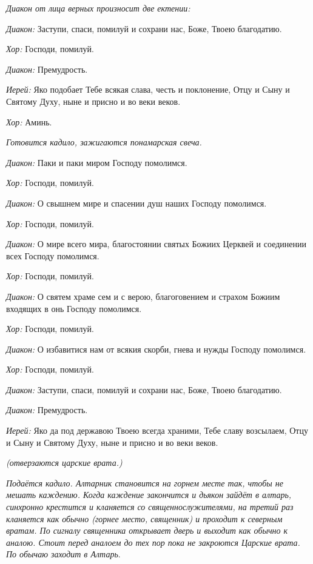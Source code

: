 \begin{mymulticols}


{\itshape Диакон от лица верных произносит две ектении:}

{\itshape Диакон:} Заступи, спаси, помилуй и сохрани нас, Боже, Твоею благодатию.

{\itshape Хор:} Господи, помилуй.

{\itshape Диакон:} Премудрость.

{\itshape Иерей:} Яко подобает Тебе всякая слава, честь и поклонение, Отцу и Сыну и Святому Духу, ныне и присно и во веки веков.

{\itshape Хор:} Аминь.

{\itshape Готовится кадило, зажигаются понамарская свеча.}

{\itshape Диакон:} Паки и паки миром Господу помолимся.

{\itshape Хор:} Господи, помилуй.

{\itshape Диакон:} О свышнем мире и спасении душ наших Господу помолимся. 

{\itshape Хор:} Господи, помилуй.

{\itshape Диакон:} О мире всего мира, благостоянии святых Божиих Церквей и соединении всех Господу помолимся. 

{\itshape Хор:} Господи, помилуй.

{\itshape Диакон:} О святем храме сем и с верою, благоговением и страхом Божиим входящих в онь Господу помолимся. 

{\itshape Хор:} Господи, помилуй.

{\itshape Диакон:} О избавитися нам от всякия скорби, гнева и нужды Господу помолимся. 

{\itshape Хор:} Господи, помилуй.

{\itshape Диакон:} Заступи, спаси, помилуй и сохрани нас, Боже, Твоею благодатию. 

{\itshape Диакон:} Премудрость. 

{\itshape Иерей:} Яко да под державою Твоею всегда храними, Тебе славу возсылаем, Отцу и Сыну и Святому Духу, ныне и присно и во веки веков. 

{\itshape (отверзаются царские врата.)}

{\itshape Подаётся кадило. Алтарник становится на горнем месте так, чтобы не мешать каждению. Когда каждение закончится и дьякон зайдёт в алтарь, синхронно крестится и кланяется со священнослужителями, на третий раз кланяется как обычно (горнее место, священник) и проходит к северным вратам. По сигналу священника открывает дверь и выходит как обычно к аналою. Стоит перед аналоем до тех пор пока не закроются Царские врата. По обычаю заходит в Алтарь}. 


\end{mymulticols}
